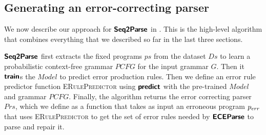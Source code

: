 \subsection{Generating an error-correcting parser}
\label{sec:whole-system:building-ecp}



We now describe our approach for $\bm{\mathsf{Seq2Parse}}$ in . This
is the high-level algorithm that combines everything that we described so far in
the last three sections.

$\bm{\mathsf{Seq2Parse}}$ first extracts the fixed programs $ps$ from the dataset $Ds$ to
learn a probabilistic context-free grammar $PCFG$ for the input grammar $G$.
Then it $\bm{\mathsf{train}}$s the $Model$ to predict error production rules. Then we
define an error rule predictor function \textsc{ERulePredictor} using
$\bm{\mathsf{predict}}$ with the pre-trained $Model$ and grammar $PCFG$. Finally, the
algorithm returns the error correcting parser $Prs$, which we define as a
function that takes as input an erroneous program $p_{err}$ that uses
\textsc{ERulePredictor} to get the set of error rules needed by $\bm{\mathsf{ECEParse}}$ to
parse and repair it.
